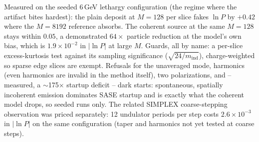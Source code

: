 \documentclass[11pt]{article}
\begin{document}
Measured on the seeded 6\,GeV lethargy configuration (the regime where the artifact
bites hardest): the plain deposit at $M=128$ per slice fakes $\ln P$ by $+0.42$
where the $M=8192$ reference absorbs. The coherent source at the same $M=128$ stays
within $0.05$, a demonstrated $64\times$ particle reduction at the model's own bias,
which is $1.9\times10^{-2}$ in $|\ln P|$ at large $M$. Guards, all by name: a
per-slice excess-kurtosis test against its sampling significance
($\sqrt{24/m_\mathrm{ind}}$), charge-weighted so sparse edge slices are exempt. Refusals
for the unaveraged mode, harmonics (even harmonics are invalid in the method itself),
two polarizations, and -- measured, a $\sim$175$\times$ startup deficit -- dark
starts: spontaneous, spatially incoherent emission dominates SASE startup and is
exactly what the coherent model drops, so seeded runs only. The related SIMPLEX
coarse-stepping observation was priced separately: 12 undulator periods per step
costs $2.6\times10^{-3}$ in $|\ln P|$ on the same configuration (taper and harmonics
not yet tested at coarse steps).
\end{document}
